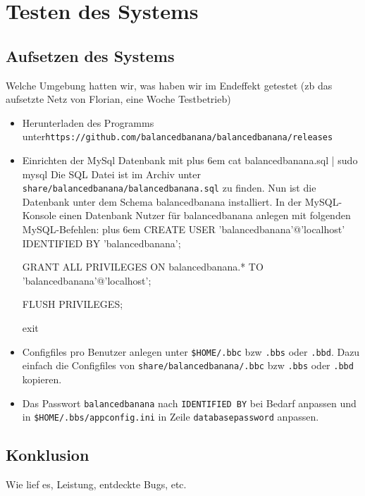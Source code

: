 \documentclass[a4paper,12pt]{article}
\makeatletter
\newenvironment{mycode}
 {\def\@xobeysp{\ }\verbatim\rightskip=0pt plus 6em\relax}
 {\endverbatim}
\makeatother
\begin{document}
\section{Testen des Systems}
\subsection{Aufsetzen des Systems}
\vspace{0.2cm}
Welche Umgebung hatten wir, was haben wir im Endeffekt getestet (zb das aufsetzte Netz von Florian, eine Woche Testbetrieb)
\begin{itemize}[label={\textbullet}]
    \item Herunterladen des Programms unter\newline \texttt{https://github.com/balancedbanana/balancedbanana/releases}
    \item Einrichten der MySql Datenbank mit \newline
    \begin{mycode}
    cat balancedbanana.sql | sudo mysql
    \end{mycode}
    Die SQL Datei ist im Archiv unter \newline \texttt{share/balancedbanana/balancedbanana.sql} \newline
    zu finden.\newline
    Nun ist die Datenbank unter dem Schema balancedbanana installiert.
    In der MySQL-Konsole einen Datenbank Nutzer für balancedbanana anlegen mit folgenden MySQL-Befehlen:
    \begin{mycode}
    CREATE USER 'balancedbanana'@'localhost' IDENTIFIED BY 
    'balancedbanana';
    	
    GRANT ALL PRIVILEGES ON balancedbanana.* TO 'balancedbanana'@'localhost';
        
    FLUSH PRIVILEGES;
        
    exit
    \end{mycode}
    \item Configfiles pro Benutzer anlegen unter \newline
    \texttt{\$HOME/.bbc} bzw \texttt{.bbs} oder \texttt{.bbd}. \newline
    Dazu einfach die Configfiles von \newline
    \texttt{share/balancedbanana/.bbc} bzw \texttt{.bbs} oder \texttt{.bbd} \newline
    kopieren.
    \item  Das Passwort \texttt{balancedbanana} nach \texttt{IDENTIFIED BY} bei Bedarf anpassen und in \newline
    \texttt{\$HOME/.bbs/appconfig.ini} \newline
    in Zeile \texttt{databasepassword} anpassen. \newline

\end{itemize}
\subsection{Konklusion}
Wie lief es, Leistung, entdeckte Bugs, etc.
\clearpage
\end{document}
